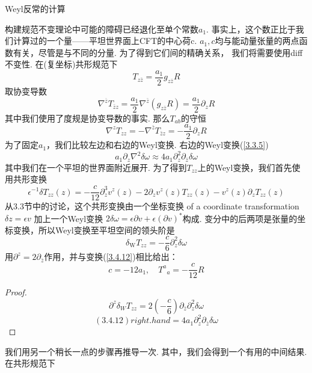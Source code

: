\centerline{\Large Weyl反常的计算}
构建规范不变理论中可能的障碍已经退化至单个常数$a_1$. 事实上，这个数正比于我们计算过的一个量——平坦世界面上CFT的中心荷c. $a_1, c$均与能动量张量的两点函数有关，尽管是与不同的分量. 为了得到它们间的精确关系， 我们将需要使用diff不变性. 在(复坐标)共形规范下
\begin{equation}
T_{z \bar{z}}=\frac{a_{1}}{2} g_{z \bar{z}} R
\end{equation}
取协变导数
\begin{equation}
\nabla^{\overline{z}} T_{\bar{z} z}=\frac{a_{1}}{2} \nabla^{\bar{z}}\left(g_{z \bar{z}} R\right)=\frac{a_{1}}{2} \partial_{z} R
\end{equation}
其中我们使用了度规是协变导数的事实. 那么$T_{ab}$的守恒
\begin{equation}\label{3.4.11}
\nabla^{z} T_{z z}=-\nabla^{\bar{z}} T_{\bar{z} z}=-\frac{a_{1}}{2} \partial_{z} R
\end{equation}
为了固定$a_1$，我们比较左边和右边的Weyl变换. 右边的Weyl变换(\ref{3.3.5})
\begin{equation}\label{3.4.12}
a_{1} \partial_{z} \nabla^{2} \delta \omega \approx 4 a_{1} \partial_{z}^{2} \partial_{\bar{z}} \delta \omega
\end{equation}
其中我们在一个平坦的世界面附近展开. 为了得到$T_{zz}$上的Weyl变换，我们首先使用共形变换
\begin{equation}
\epsilon^{-1} \delta T_{z z}(z)=-\frac{c}{12} \partial_{z}^{3} v^{z}(z)-2 \partial_{z} v^{z}(z) T_{z z}(z)-v^{z}(z) \partial_{z} T_{z z}(z)
\end{equation}
从3.3节中的讨论，这个共形变换由一个坐标变换
of a coordinate transformation $\delta z=\epsilon v$ 加上一个Weyl变换 $2 \delta \omega=\epsilon \partial v+\epsilon(\partial v)^{*}$构成. 变分中的后两项是张量的坐标变换，所以Weyl变换至平坦空间的领头阶是
\begin{equation}
\delta_{\mathrm{W}} T_{z z}=-\frac{c}{6} \partial_{z}^{2} \delta \omega
\end{equation}
用$\partial^{z}=2 \partial_{\bar{z}}$作用，并与变换(\ref{3.4.12})相比给出：
\begin{equation}\label{3.4.15}
c=-12 a_{1}, \quad {T^a}_{a}=-\frac{c}{12} R
\end{equation}
\begin{proof}
$$
\partial^{z} \delta_{W} T_{z z}=2\left(-\frac{c}{6}\right) \partial_{\bar{z}} \partial_{z}^{2} \delta \omega
$$
$$
(3.4.12)right. hand=4 a_{1} \partial_{z}^{2} \partial_{\bar{z}} \delta \omega
$$
\end{proof}
我们用另一个稍长一点的步骤再推导一次. 其中，我们会得到一个有用的中间结果. 在共形规范下
